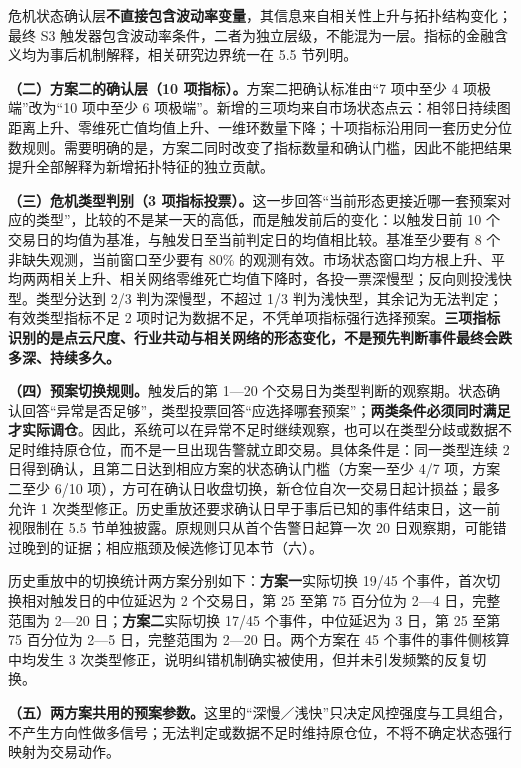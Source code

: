 \documentclass[12pt,a4paper]{ctexart}
\begin{document}
危机状态确认层\textbf{不直接包含波动率变量}，其信息来自相关性上升与拓扑结构变化；最终 S3 触发器包含波动率条件，二者为独立层级，不能混为一层。指标的金融含义均为事后机制解释，相关研究边界统一在 5.5 节列明。\par
\textbf{（二）方案二的确认层（10 项指标）。}方案二把确认标准由“7 项中至少 4 项极端”改为“10 项中至少 6 项极端”。新增的三项均来自市场状态点云：相邻日持续图距离上升、零维死亡值均值上升、一维环数量下降；十项指标沿用同一套历史分位数规则。需要明确的是，方案二同时改变了指标数量和确认门槛，因此不能把结果提升全部解释为新增拓扑特征的独立贡献。\par
\textbf{（三）危机类型判别（3 项指标投票）。}这一步回答“当前形态更接近哪一套预案对应的类型”，比较的不是某一天的高低，而是触发前后的变化：以触发日前 10 个交易日的均值为基准，与触发日至当前判定日的均值相比较。基准至少要有 8 个非缺失观测，当前窗口至少要有 80\% 的观测有效。市场状态窗口均方根上升、平均两两相关上升、相关网络零维死亡均值下降时，各投一票深慢型；反向则投浅快型。类型分达到 2/3 判为深慢型，不超过 1/3 判为浅快型，其余记为无法判定；有效类型指标不足 2 项时记为数据不足，不凭单项指标强行选择预案。\textbf{三项指标识别的是点云尺度、行业共动与相关网络的形态变化，不是预先判断事件最终会跌多深、持续多久。}\par
\textbf{（四）预案切换规则。}触发后的第 1—20 个交易日为类型判断的观察期。状态确认回答“异常是否足够”，类型投票回答“应选择哪套预案”；\textbf{两类条件必须同时满足才实际调仓}。因此，系统可以在异常不足时继续观察，也可以在类型分歧或数据不足时维持原仓位，而不是一旦出现告警就立即交易。具体条件是：同一类型连续 2 日得到确认，且第二日达到相应方案的状态确认门槛（方案一至少 4/7 项，方案二至少 6/10 项），方可在确认日收盘切换，新仓位自次一交易日起计损益；最多允许 1 次类型修正。历史重放还要求确认日早于事后已知的事件结束日，这一前视限制在 5.5 节单独披露。原规则只从首个告警日起算一次 20 日观察期，可能错过晚到的证据；相应瓶颈及候选修订见本节（六）。\par
历史重放中的切换统计两方案分别如下：\textbf{方案一}实际切换 19/45 个事件，首次切换相对触发日的中位延迟为 2 个交易日，第 25 至第 75 百分位为 2—4 日，完整范围为 2—20 日；\textbf{方案二}实际切换 17/45 个事件，中位延迟为 3 日，第 25 至第 75 百分位为 2—5 日，完整范围为 2—20 日。两个方案在 45 个事件的事件侧核算中均发生 3 次类型修正，说明纠错机制确实被使用，但并未引发频繁的反复切换。\par
\textbf{（五）两方案共用的预案参数。}这里的“深慢／浅快”只决定风控强度与工具组合，不产生方向性做多信号；无法判定或数据不足时维持原仓位，不将不确定状态强行映射为交易动作。\par
\end{document}
